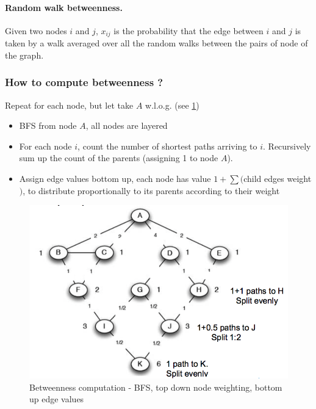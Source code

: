 \paragraph{Random walk betweenness.}
  Given two nodes $i$ and $j$, $x_{ij}$ is the probability that the edge between $i$ and $j$ is taken by a walk averaged over all the random walks between the pairs of node of the graph.


\subsubsection{How to compute betweenness ?} 

Repeat for each node, but let take $A$ w.l.o.g. (see \cref{fig:betweenness})

\begin{itemize}
  \item BFS from node $A$, all nodes are layered
  \item For each node $i$, count the number of shortest paths arriving to $i$. Recursively sum up the count of the parents (assigning 1 to node $A$).
  \item Assign edge values bottom up, each node has value $1 + \sum ($child edges weight$)$, to distribute proportionally to its parents according to their weight
\end{itemize}


\begin{figure}
  \centering
  \includegraphics[width=1\linewidth]{figures/betweenness_computation.png}
  \caption{Betweenness computation - BFS, top down node weighting, bottom up edge values}
  \label{fig:betweenness}
\end{figure}

